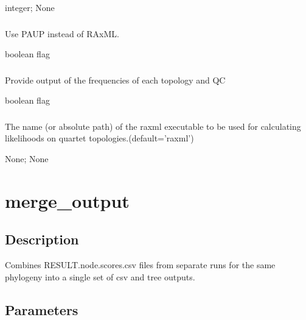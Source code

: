 \documentclass[letterpaper,12pt,english]{sphinxmanual}
\begin{document}
 integer;  None


\subsubsection{}
\label{\detokenize{prog_desc:p-paup}}
 Use PAUP instead of RAxML.

 boolean flag


\subsubsection{}
\label{\detokenize{prog_desc:v-verbout}}
 Provide output of the frequencies of each topology and QC

 boolean flag


\subsubsection{}
\label{\detokenize{prog_desc:x-raxml-executable}}
 The name (or absolute path) of the raxml executable to be used for calculating likelihoods on quartet topologies.(default=’raxml’)

 None;  None


\section{merge\_output}
\label{\detokenize{prog_desc:merge-output}}

\subsection{Description}
\label{\detokenize{prog_desc:id1}}
Combines RESULT.node.scores.csv files from separate
runs for the same phylogeny into a single set of csv and tree outputs.



\subsection{Parameters}
\label{\detokenize{prog_desc:id2}}
\end{document}
